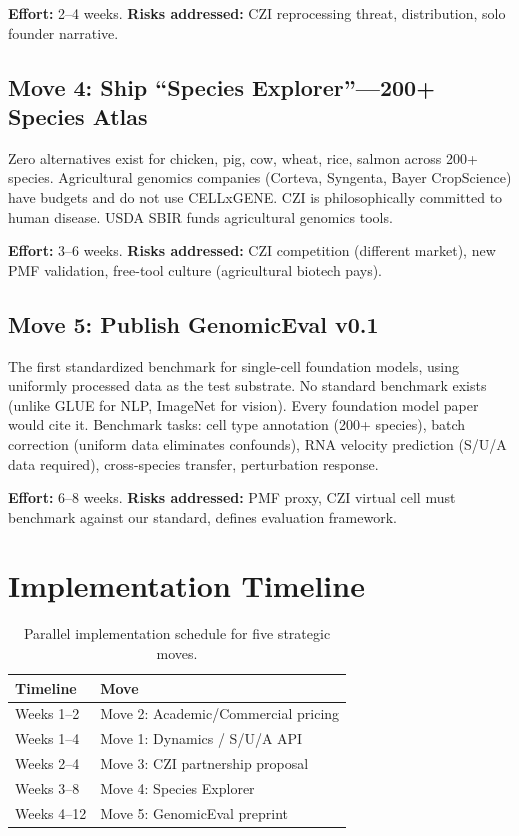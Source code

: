 \documentclass[10pt,twocolumn,letterpaper]{article}
\begin{document}
\textbf{Effort:} 2--4 weeks. \textbf{Risks addressed:} CZI reprocessing threat,
distribution, solo founder narrative.

\subsection{Move 4: Ship ``Species Explorer''---200+ Species Atlas}

Zero alternatives exist for chicken, pig, cow, wheat, rice, salmon across 200+
species. Agricultural genomics companies (Corteva, Syngenta, Bayer CropScience)
have budgets and do not use CELLxGENE. CZI is philosophically committed to human
disease. USDA SBIR funds agricultural genomics tools.

\textbf{Effort:} 3--6 weeks. \textbf{Risks addressed:} CZI competition (different
market), new PMF validation, free-tool culture (agricultural biotech pays).

\subsection{Move 5: Publish GenomicEval v0.1}

The first standardized benchmark for single-cell foundation models, using
uniformly processed data as the test substrate. No standard benchmark exists
(unlike GLUE for NLP, ImageNet for vision). Every foundation model paper would
cite it. Benchmark tasks: cell type annotation (200+ species), batch correction
(uniform data eliminates confounds), RNA velocity prediction (S/U/A data
required), cross-species transfer, perturbation response.

\textbf{Effort:} 6--8 weeks. \textbf{Risks addressed:} PMF proxy, CZI virtual
cell must benchmark against our standard, defines evaluation framework.

\section{Implementation Timeline}
\label{sec:timeline}

\begin{table}[h]
\centering
\small
\begin{tabular}{@{}ll@{}}
\toprule
\textbf{Timeline} & \textbf{Move} \\
\midrule
Weeks 1--2 & Move 2: Academic/Commercial pricing \\
Weeks 1--4 & Move 1: Dynamics / S/U/A API \\
Weeks 2--4 & Move 3: CZI partnership proposal \\
Weeks 3--8 & Move 4: Species Explorer \\
Weeks 4--12 & Move 5: GenomicEval preprint \\
\bottomrule
\end{tabular}
\caption{Parallel implementation schedule for five strategic moves.}
\label{tab:timeline}
\end{table}
\end{document}
